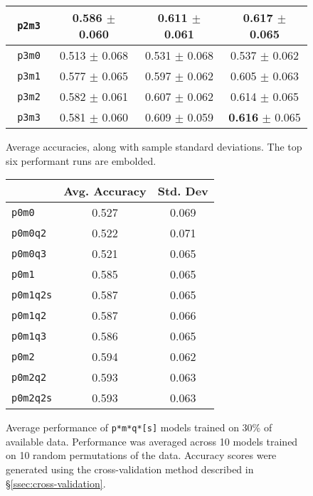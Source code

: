 \begin{figure*}
\begin{minipage}[b]{0.45\textwidth}
\begin{centering}
\begin{tabular}{ l | c c c }
    \texttt{ p2m3 } &   0.586 $\pm$ 0.060 & 0.611 $\pm$ 0.061 & \textbf{0.617} $\pm$ 0.065 \\
    \hline
    \texttt{ p3m0 } &   0.513 $\pm$ 0.068 & 0.531 $\pm$ 0.068 & 0.537 $\pm$ 0.062 \\
    \texttt{ p3m1 } &   0.577 $\pm$ 0.065 & 0.597 $\pm$ 0.062 & 0.605 $\pm$ 0.063 \\
    \texttt{ p3m2 } &   0.582 $\pm$ 0.061 & 0.607 $\pm$ 0.062 & 0.614 $\pm$ 0.065 \\
    \texttt{ p3m3 } &   0.581 $\pm$ 0.060 & 0.609 $\pm$ 0.059 & \textbf{0.616} $\pm$ 0.065 \\
    \end{tabular}
    \end{centering}
    \vspace{0.225in}
    \caption{Average accuracies, along with sample standard deviations. The
    top six performant runs are embolded.}
    \label{subfig:pm-model-table}
    \vspace{0.575in}
  \end{minipage}
\end{figure*}


\begin{figure}
  \centering
  \begin{tabular}{l | c c}
     & Avg. Accuracy & Std. Dev \\
    \hline
    \texttt{p0m0} & 0.527 & 0.069 \\
    \texttt{p0m0q2} & 0.522 & 0.071 \\
    \texttt{p0m0q3} & 0.521 & 0.065 \\
    \texttt{p0m1} & 0.585 & 0.065 \\
    \texttt{p0m1q2s} & 0.587 & 0.065 \\
    \texttt{p0m1q2} & 0.587 & 0.066 \\
    \texttt{p0m1q3} & 0.586 & 0.065 \\
    \texttt{p0m2} & 0.594 & 0.062 \\
    \texttt{p0m2q2} & 0.593 & 0.063 \\
    \texttt{p0m2q2s} & 0.593 & 0.063 \\
  \end{tabular}

  \caption{ Average performance of \texttt{p*m*q*[s]} models trained on 30\% of
  available data.  Performance was averaged across 10 models trained on 10
  random permutations of the data. Accuracy scores were generated using the
  cross-validation method described in \S \ref{ssec:cross-validation}.}
  \label{subfig:pmq-model-chart}

\end{figure}

